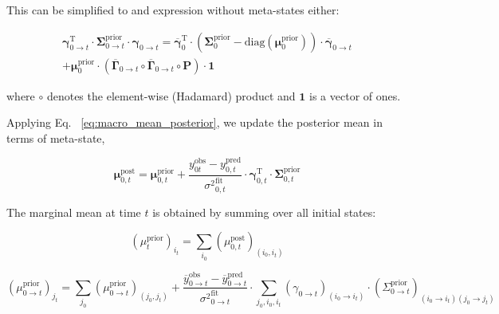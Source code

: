 \documentclass[pdflatex,sn-mathphys-num]{sn-jnl}%
\theoremstyle{thmstyleone}%
\theoremstyle{thmstyletwo}%
\theoremstyle{thmstylethree}%
\begin{document}
This can be simplified to and expression without meta-states either:

\begin{multline}
	\mathbf{\gamma}^{\mathrm{T}}_{0 \rightarrow t} \cdot \mathbf{\Sigma}^{\mathrm{prior}}_{0 \rightarrow t} \cdot \mathbf{\gamma}_{0 \rightarrow t} = 
	\overline{\mathbf{\gamma}}_{0}^{\mathrm{T}} \cdot 
	\left( \mathbf{\Sigma}^{\mathrm{prior}}_{0} - \mathrm{diag}(\mathbf{\mu}^{\mathrm{prior}}_0) \right) \cdot 
	\overline{\mathbf{\gamma}}_{0 \rightarrow t} \\
	+ \mathbf{\mu}^{\mathrm{prior}}_0 \cdot \left( \overline{\mathbf{\Gamma}}_{0 \rightarrow t} \circ \overline{\mathbf{\Gamma}}_{0 \rightarrow t} \circ \mathbf{P} \right) \cdot \mathbf{1}
	\label{eq:simplified_meta_state}
\end{multline}

where \( \circ \) denotes the element-wise (Hadamard) product and \( \mathbf{1} \) is a vector of ones.


Applying Eq. ~\ref{eq:macro_mean_posterior}, we update the posterior mean in terms of meta-state,

\begin{equation}
	\mathbf{\mu}^{\mathrm{post}}_{0, t} = \mathbf{\mu}^{\mathrm{prior}}_{0, t} + 
	\frac{y^{\mathrm{obs}}_{0 t} - y^{\mathrm{pred}}_{0, t}}{{\sigma^2}^{\mathrm{fit}}_{0, t}} 
	\cdot \mathbf{\gamma}^{\mathrm{T}}_{0, t} \cdot \mathbf{\Sigma}^{\mathrm{prior}}_{0, t}
	\label{eq:meta_posterior_mean_update}
\end{equation}

The marginal mean at time \( t \) is obtained by summing over all initial states:

\begin{equation}
	(\mu^{\mathrm{prior}}_{t})_{i_t} = \sum_{i_0} (\mu^{\mathrm{post}}_{0, t})_{(i_0, i_t)}
	\label{eq:marginal_prior_mean}
\end{equation}

\begin{equation}
	(\mu^{\mathrm{prior}}_{0 \rightarrow t})_{j_{t}} = 
	\sum_{j_0} (\mu^{\mathrm{prior}}_{0 \rightarrow t})_{(j_0, j_{t})} 
	+ \frac{\overline{y}^{\mathrm{obs}}_{0 \rightarrow t} - \overline{y}^{\mathrm{pred}}_{0 \rightarrow t}}{{\sigma^2}^{\mathrm{fit}}_{0 \rightarrow t}} \cdot 
	\sum_{j_0, i_0, i_{t}} (\gamma_{0 \rightarrow t})_{(i_0 \rightarrow i_{t})} \cdot (\Sigma^{\mathrm{prior}}_{0 \rightarrow t})_{(i_0 \rightarrow i_{t})(j_0 \rightarrow j_{t})}
	\label{eq:mu_prior_update_0_to_t}
\end{equation}
\end{document}
